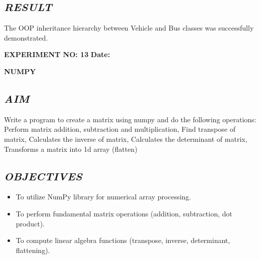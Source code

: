 \documentclass[11pt,a4paper]{article}
\begin{document}
\subsection*{\textit{RESULT}}
The OOP inheritance hierarchy between Vehicle and Bus classes was successfully demonstrated.

\newpage

\noindent
\textbf{\large EXPERIMENT NO: 13} \hfill \textbf{\large Date: \underline{\hspace{3cm}}}

\vspace{0.2cm}
\begin{center}
{\Huge \textbf{\textcolor{navyblue}{NUMPY}}}
\end{center}
\vspace{0.3cm}

\subsection*{\textit{AIM}}
Write a program to create a matrix using numpy and do the following operations: Perform matrix addition, subtraction and multiplication, Find transpose of matrix, Calculates the inverse of matrix, Calculates the determinant of matrix, Transforms a matrix into 1d array (flatten)

\subsection*{\textit{OBJECTIVES}}
\begin{itemize}
  \item To utilize NumPy library for numerical array processing.
  \item To perform fundamental matrix operations (addition, subtraction, dot product).
  \item To compute linear algebra functions (transpose, inverse, determinant, flattening).
\end{itemize}
\end{document}
